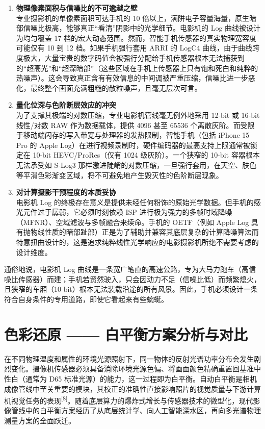 \documentclass[12pt, a4paper]{ctexart}
\newcommand{\scite}[1]{\textsuperscript{[#1]}}
\begin{document}
\begin{enumerate}
    \item \textbf{物理像素面积与信噪比的不可逾越之壁} \\
    专业摄影机的单像素面积可达手机的 10 倍以上，满阱电子容量海量，原生暗部信噪比极高，能够真正“看清”阴影中的光学细节。电影机的 Log 曲线被设计为均匀覆盖 17 档的宏大动态范围。然而，智能手机传感器的真实物理宽容度可能仅有 10 到 12 档。如果手机强行套用 ARRI 的 LogC4 曲线，由于曲线跨度极大，大量宝贵的数字码值会被强行分配给手机传感器根本无法捕获到的“超高光”和“超深暗部”（这些区域在手机上传感器上只有饱和死白和纯粹的热噪声）。这会导致真正含有有效信息的中间调被严重压缩，信噪比进一步恶化，最终整个画面充满粗糙的散粒噪声，且毫无层次可言。
    \item \textbf{量化位深与色阶断层效应的冲突} \\
    为了支撑其极端的对数压缩，专业电影机管线毫无例外地采用 12-bit 或 16-bit 线性/对数 RAW 作为数据载体，提供 4096 甚至 65536 个离散灰阶。而受限于移动端闪存的写入带宽与处理器的发热限制，智能手机（包括 iPhone 15 Pro 的 Apple Log）在进行视频录制时，硬件编码器的最高支持上限通常被锁定在 10-bit HEVC/ProRes（仅有 1024 级灰阶）。一个狭窄的 10-bit 容器根本无法承受如 S-Log3 那样激进陡峭的对数压缩，一旦强行套用，在天空、肤色等平滑色彩渐变区域，将不可避免地产生毁灭性的色阶断层现象。
    \item \textbf{对计算摄影干预程度的本质妥协} \\
    电影机 Log 的终极存在意义是提供未经任何粉饰的原始光学数据。但手机的感光元件过于孱弱，它必须时刻依赖 ISP 进行极为强力的多帧时域降噪（MFNR）、空域滤波与多帧融合来续命。手机的 OETF（例如 Apple Log 具有抛物线性质的暗部趾部）正是为了辅助并兼容其底层复杂的计算降噪算法而特意扭曲设计的，这是追求纯粹线性光学响应的电影摄影机所绝不需要考虑的设计维度。
\end{enumerate}

通俗地说，电影机 Log 曲线是一条宽广笔直的高速公路，专为大马力跑车（高信噪比传感器）而建；手机若贸然驶入，只会因动力不足（信噪比低）而频繁熄火，且狭窄的车厢（10-bit）根本无法装载沿途的所有风景。因此，手机必须设计一条符合自身条件的专用道路，即使它看起来有些蜿蜒。

\section{色彩还原 —— 白平衡方案分析与对比}

在不同物理温度和属性的环境光源照射下，同一物体的反射光谱功率分布会发生剧烈变化。摄像机传感器必须具备消除环境光源色偏、将画面颜色精确重置回基准中性白（通常为 D65 标准光源）的能力，这一过程即为白平衡。自动白平衡是相机成像管线中至关重要的模块，其校正的准确性直接影响照片的视觉质量与下游计算机视觉任务的表现\scite{8}。随着底层算力的爆炸式增长与传感器技术的微型化，现代影像管线中的白平衡方案经历了从底层统计学、向人工智能深水区，再向多光谱物理测量方案的全面跃迁。
\end{document}
